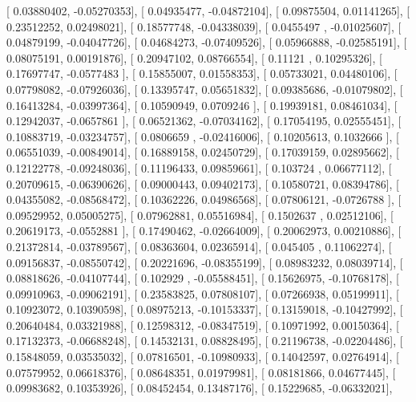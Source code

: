 \documentclass{article}
\begin{document}
       [ 0.03880402, -0.05270353],
       [ 0.04935477, -0.04872104],
       [ 0.09875504,  0.01141265],
       [ 0.23512252,  0.02498021],
       [ 0.18577748, -0.04338039],
       [ 0.0455497 , -0.01025607],
       [ 0.04879199, -0.04047726],
       [ 0.04684273, -0.07409526],
       [ 0.05966888, -0.02585191],
       [ 0.08075191,  0.00191876],
       [ 0.20947102,  0.08766554],
       [ 0.11121   ,  0.10295326],
       [ 0.17697747, -0.0577483 ],
       [ 0.15855007,  0.01558353],
       [ 0.05733021,  0.04480106],
       [ 0.07798082, -0.07926036],
       [ 0.13395747,  0.05651832],
       [ 0.09385686, -0.01079802],
       [ 0.16413284, -0.03997364],
       [ 0.10590949,  0.0709246 ],
       [ 0.19939181,  0.08461034],
       [ 0.12942037, -0.0657861 ],
       [ 0.06521362, -0.07034162],
       [ 0.17054195,  0.02555451],
       [ 0.10883719, -0.03234757],
       [ 0.0806659 , -0.02416006],
       [ 0.10205613,  0.1032666 ],
       [ 0.06551039, -0.00849014],
       [ 0.16889158,  0.02450729],
       [ 0.17039159,  0.02895662],
       [ 0.12122778, -0.09248036],
       [ 0.11196433,  0.09859661],
       [ 0.103724  ,  0.06677112],
       [ 0.20709615, -0.06390626],
       [ 0.09000443,  0.09402173],
       [ 0.10580721,  0.08394786],
       [ 0.04355082, -0.08568472],
       [ 0.10362226,  0.04986568],
       [ 0.07806121, -0.0726788 ],
       [ 0.09529952,  0.05005275],
       [ 0.07962881,  0.05516984],
       [ 0.1502637 ,  0.02512106],
       [ 0.20619173, -0.0552881 ],
       [ 0.17490462, -0.02664009],
       [ 0.20062973,  0.00210886],
       [ 0.21372814, -0.03789567],
       [ 0.08363604,  0.02365914],
       [ 0.045405  ,  0.11062274],
       [ 0.09156837, -0.08550742],
       [ 0.20221696, -0.08355199],
       [ 0.08983232,  0.08039714],
       [ 0.08818626, -0.04107744],
       [ 0.102929  , -0.05588451],
       [ 0.15626975, -0.10768178],
       [ 0.09910963, -0.09062191],
       [ 0.23583825,  0.07808107],
       [ 0.07266938,  0.05199911],
       [ 0.10923072,  0.10390598],
       [ 0.08975213, -0.10153337],
       [ 0.13159018, -0.10427992],
       [ 0.20640484,  0.03321988],
       [ 0.12598312, -0.08347519],
       [ 0.10971992,  0.00150364],
       [ 0.17132373, -0.06688248],
       [ 0.14532131,  0.08828495],
       [ 0.21196738, -0.02204486],
       [ 0.15848059,  0.03535032],
       [ 0.07816501, -0.10980933],
       [ 0.14042597,  0.02764914],
       [ 0.07579952,  0.06618376],
       [ 0.08648351,  0.01979981],
       [ 0.08181866,  0.04677445],
       [ 0.09983682,  0.10353926],
       [ 0.08452454,  0.13487176],
       [ 0.15229685, -0.06332021],
\end{document}
